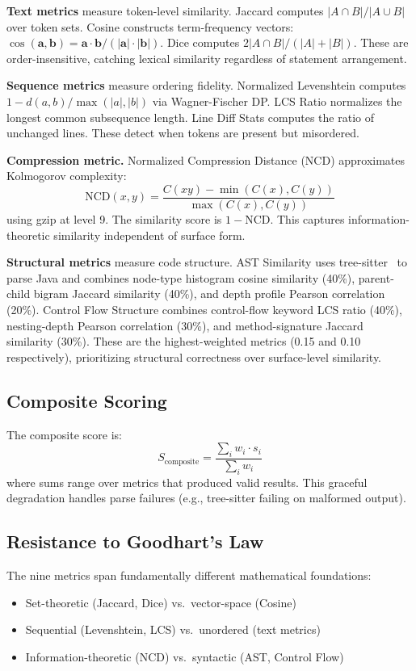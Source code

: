 \documentclass[conference,11pt]{IEEEtran}
\begin{document}
\textbf{Text metrics} measure token-level similarity. Jaccard computes $|A \cap B| / |A \cup B|$ over token sets. Cosine constructs term-frequency vectors: $\cos(\mathbf{a}, \mathbf{b}) = \mathbf{a} \cdot \mathbf{b} / (|\mathbf{a}| \cdot |\mathbf{b}|)$. Dice computes $2|A \cap B| / (|A| + |B|)$. These are order-insensitive, catching lexical similarity regardless of statement arrangement.

\textbf{Sequence metrics} measure ordering fidelity. Normalized Levenshtein computes $1 - d(a,b) / \max(|a|, |b|)$ via Wagner-Fischer DP. LCS Ratio normalizes the longest common subsequence length. Line Diff Stats computes the ratio of unchanged lines. These detect when tokens are present but misordered.

\textbf{Compression metric.} Normalized Compression Distance (NCD) approximates Kolmogorov complexity:
\[
\text{NCD}(x,y) = \frac{C(xy) - \min(C(x), C(y))}{\max(C(x), C(y))}
\]
using gzip at level 9. The similarity score is $1 - \text{NCD}$. This captures information-theoretic similarity independent of surface form.

\textbf{Structural metrics} measure code structure. AST Similarity uses tree-sitter~\cite{treesitter} to parse Java and combines node-type histogram cosine similarity (40\%), parent-child bigram Jaccard similarity (40\%), and depth profile Pearson correlation (20\%). Control Flow Structure combines control-flow keyword LCS ratio (40\%), nesting-depth Pearson correlation (30\%), and method-signature Jaccard similarity (30\%). These are the highest-weighted metrics (0.15 and 0.10 respectively), prioritizing structural correctness over surface-level similarity.

\subsection{Composite Scoring}

The composite score is:
\[
S_{\text{composite}} = \frac{\sum_{i} w_i \cdot s_i}{\sum_{i} w_i}
\]
where sums range over metrics that produced valid results. This graceful degradation handles parse failures (e.g., tree-sitter failing on malformed output).

\subsection{Resistance to Goodhart's Law}

The nine metrics span fundamentally different mathematical foundations:
\begin{itemize}
    \item Set-theoretic (Jaccard, Dice) vs.\ vector-space (Cosine)
    \item Sequential (Levenshtein, LCS) vs.\ unordered (text metrics)
    \item Information-theoretic (NCD) vs.\ syntactic (AST, Control Flow)
\end{itemize}
\end{document}
